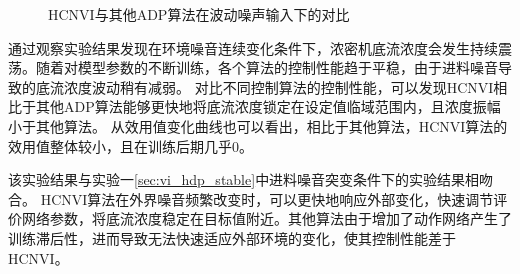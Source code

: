 \begin{figure}[htb]
\centering 
\caption{HCNVI与其他ADP算法在波动噪声输入下的对比}
    \label{fig:noise_HCNVI_HDP}
\end{figure}


通过观察实验结果发现在环境噪音连续变化条件下，浓密机底流浓度会发生持续震荡。随着对模型参数的不断训练，各个算法的控制性能趋于平稳，由于进料噪音导致的底流浓度波动稍有减弱。
对比不同控制算法的控制性能，可以发现HCNVI相比于其他ADP算法能够更快地将底流浓度锁定在设定值临域范围内，且浓度振幅小于其他算法。
从效用值变化曲线也可以看出，相比于其他算法，HCNVI算法的效用值整体较小，且在训练后期几乎0。

该实验结果与实验一\ref{sec:vi_hdp_stable}中进料噪音突变条件下的实验结果相吻合。
HCNVI算法在外界噪音频繁改变时，可以更快地响应外部变化，快速调节评价网络参数，将底流浓度稳定在目标值附近。其他算法由于增加了动作网络产生了训练滞后性，进而导致无法快速适应外部环境的变化，使其控制性能差于HCNVI。

